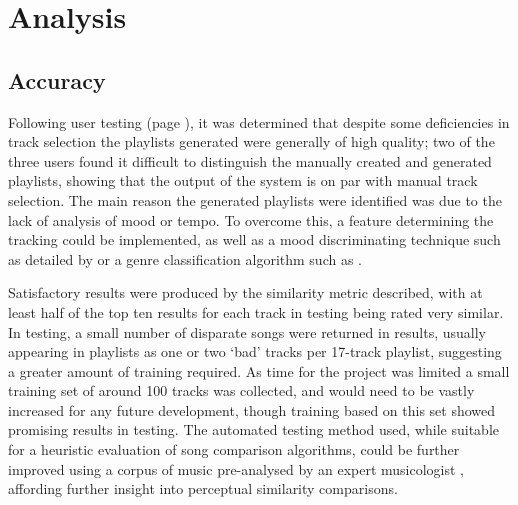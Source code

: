 \chapter{Analysis}
\begin{comment}
	\item Subject the findings to scrutiny as to what they might mean
	\item Discussion and analysis of the theories, ideas, issues and challenges noted earlier in the writing. Do you have both intended and unintended outcomes?
	\item A `making sense' of the findings by considering their implications for the questions raised
	\item A critique of the research method (data collection tools?) used and their validity and reliability
\end{comment}
\section{Accuracy}
Following user testing (page \pageref{text:testing:user}), it was determined that despite some deficiencies in track selection the playlists generated were generally of high quality; two of the three users found it difficult to distinguish the manually created and generated playlists, showing that the output of the system is on par with manual track selection. The main reason the generated playlists were identified was due to the lack of analysis of mood or tempo. To overcome this, a feature determining the tracking could be implemented, as well as a mood discriminating technique such as detailed by \citet*{Liu2003} or a genre classification algorithm such as \citet*{Basili2004}.

Satisfactory results were produced by the similarity metric described, with at least half of the top ten results for each track in testing being rated very similar. In testing, a small number of disparate songs were returned in results, usually appearing in playlists as one or two `bad' tracks per 17-track playlist, suggesting a greater amount of training required. As time for the project was limited a small training set of around 100 tracks was collected, and would need to be vastly increased for any future development, though training based on this set showed promising results in testing. The automated testing method used, while suitable for a heuristic evaluation of song comparison algorithms, could be further improved using a corpus of music pre-analysed by an expert musicologist \citep{Muellensiefen2004}, affording further insight into perceptual similarity comparisons.

